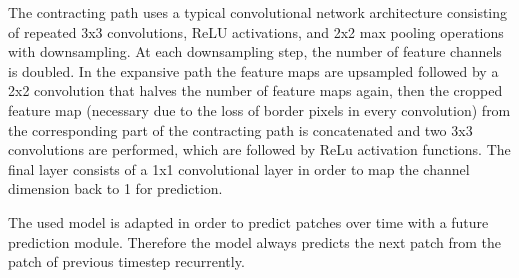 \documentclass[12pt]{article}
\begin{document}
The contracting path uses a typical convolutional network architecture consisting of repeated 3x3 convolutions, ReLU activations, and 2x2 max pooling operations with downsampling. At each downsampling step, the number of feature channels is doubled. In the expansive path the feature maps are upsampled followed by a 2x2 convolution that halves the number of feature maps again, then the cropped feature map (necessary due to the loss of border pixels in every convolution) from the corresponding part of the contracting path is concatenated and two 3x3 convolutions are performed, which are followed by ReLu activation functions. The final layer consists of a 1x1 convolutional layer in order to map the channel dimension back to 1 for prediction. 

The used model is adapted in order to predict patches over time with a future prediction module. Therefore the model always predicts the next patch from the patch of previous timestep recurrently.
\end{document}
